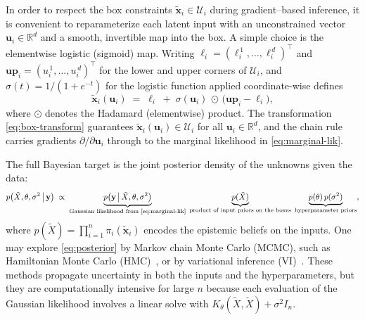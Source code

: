 \documentclass[a4paper,12pt]{article}
\newcommand{\x}{\mathbf{x}}
\begin{document}
In order to respect the box constraints $\tilde{\x}_i\in\mathcal{U}_i$ during gradient–based inference, it is convenient to reparameterize each latent input with an unconstrained vector $\mathbf{u}_i\in\mathbb{R}^d$ and a smooth, invertible map into the box. A simple choice is the elementwise logistic (sigmoid) map. Writing $\boldsymbol{\ell}_i=(\ell_i^{\,1},\ldots,\ell_i^{\,d})^\top$ and $\mathbf{u\!p}_i=(u_i^{\,1},\ldots,u_i^{\,d})^\top$ for the lower and upper corners of $\mathcal{U}_i$, and $\sigma(t)=1/(1+e^{-t})$ for the logistic function applied coordinate-wise defines
\begin{equation}
\label{eq:box-transform}
\tilde{\x}_i(\mathbf{u}_i) \;=\; \boldsymbol{\ell}_i \;+\; \sigma(\mathbf{u}_i)\,\odot\,\big(\mathbf{u\!p}_i-\boldsymbol{\ell}_i\big),
\end{equation}
where $\odot$ denotes the Hadamard (elementwise) product. The transformation \eqref{eq:box-transform} guarantees $\tilde{\x}_i(\mathbf{u}_i)\in\mathcal{U}_i$ for all $\mathbf{u}_i\in\mathbb{R}^d$, and the chain rule carries gradients $\partial/\partial \mathbf{u}_i$ through to the marginal likelihood in \eqref{eq:marginal-lik}. 

The full Bayesian target is the joint posterior density of the unknowns given the data:
\begin{equation}
\label{eq:posterior}
p\big(\tilde{X},\theta,\sigma^2 \,\big|\, \mathbf{y}\big) \;\propto\; 
\underbrace{p\big(\mathbf{y}\,\big|\,\tilde{X},\theta,\sigma^2\big)}_{\text{Gaussian likelihood from \eqref{eq:marginal-lik}}}\;
\underbrace{p(\tilde{X})}_{\text{product of input priors on the boxes}}\;
\underbrace{p(\theta)\,p(\sigma^2)}_{\text{hyperparameter priors}},
\end{equation}
where $p(\tilde{X})=\prod_{i=1}^n \pi_i(\tilde{\x}_i)$ encodes the epistemic beliefs on the inputs. One may explore \eqref{eq:posterior} by Markov chain Monte Carlo (MCMC), such as Hamiltonian Monte Carlo (HMC)~\cite{betancourt2017conceptual}, or by variational inference (VI)~\cite{blei2017variational}. These methods propagate uncertainty in both the inputs and the hyperparameters, but they are computationally intensive for large $n$ because each evaluation of the Gaussian likelihood involves a linear solve with $K_\theta(\tilde{X},\tilde{X})+\sigma^2 I_n$.
\end{document}
